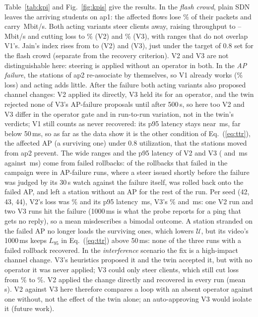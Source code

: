 \documentclass[conference]{IEEEtran}
\begin{document}
Table~\ref{tab:kpi} and Fig.~\ref{fig:kpis} give the results. In the \emph{flash crowd}, plain SDN leaves the arriving students on ap1: the affected flows lose \KpiFlashLossVone\% of their packets and carry \KpiFlashThrVone\,Mbit/s. Both acting variants steer clients away, raising throughput to \KpiFlashThrVtwo--\KpiFlashThrVthree\,Mbit/s and cutting loss to \KpiFlashLossVtwo\% (V2) and \KpiFlashLossVthree\% (V3), with ranges that do not overlap V1's. Jain's index rises from \FairJainVone{} to \FairJainVtwo{} (V2) and \FairJainVthree{} (V3), just under the target of 0.8 set for the flash crowd (separate from the recovery criterion). V2 and V3 are not distinguishable here: steering is applied without an operator in both. In the \emph{AP failure}, the stations of ap2 re-associate by themselves, so V1 already works (\KpiApFailLossVone\% loss) and acting adds little. After the failure both acting variants also proposed channel changes: V2 applied its \ChanApFailVtwoApplied{} directly, V3 held its \ChanApFailVthreeWaiting{} for an operator, and the twin rejected none of V3's AP-failure proposals until after 500\,s, so here too V2 and V3 differ in the operator gate and in run-to-run variation, not in the twin's verdicts; V1 still counts as never recovered: its p95 latency stays near \KpiApFailLatVone\,ms, far below 50\,ms, so as far as the data show it is the other condition of Eq.~(\ref{eq:ttr}), the affected AP (a surviving one) under 0.8 utilization, that the stations moved from ap2 prevent. The wide ranges and the p95 latency of V2 and V3 (\KpiApFailLatVtwo{} and \KpiApFailLatVthree\,ms against \KpiApFailLatVone\,ms) come from failed rollbacks: \RbFailApFail{} of the \RbFailAll{} rollbacks that failed in the campaign were in AP-failure runs, where a steer issued shortly before the failure was judged by its 30\,s watch against the failure itself, was rolled back onto the failed AP, and left a station without an AP for the rest of the run. Per seed (42, 43, 44), V2's loss was \PerSeedLossApFailVtwo\% and its p95 latency \PerSeedLatApFailVtwo\,ms, V3's \PerSeedLossApFailVthree\% and \PerSeedLatApFailVthree\,ms: one V2 run and two V3 runs hit the failure (1000\,ms is what the probe reports for a ping that gets no reply), so a mean misdescribes a bimodal outcome. A station stranded on the failed AP no longer loads the surviving ones, which lowers $\mathcal U$, but its video's 1000\,ms keeps $L_{95}$ in Eq.~(\ref{eq:ttr}) above 50\,ms: none of the three runs with a failed rollback recovered. In the \emph{interference} scenario the fix is a high-impact channel change. V3's heuristics proposed it and the twin accepted it, but with no operator it was never applied; V3 could only steer clients, which still cut loss from \KpiCochanLossVone\% to \KpiCochanLossVthree\%. V2 applied the change directly and recovered in every run (mean \KpiCochanTtrVtwo\,s). V2 against V3 here therefore compares a loop with an absent operator against one without, not the effect of the twin alone; an auto-approving V3 would isolate it (future work).
\end{document}
